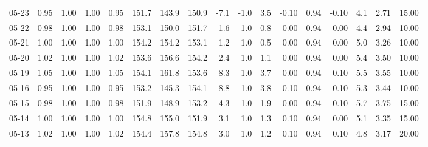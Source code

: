 \begin{threeparttable}
{\begin{tabular}{lrrrrrrrrrrrrrrrr}
  05-23 &         0.95 &           1.00 &          1.00 &          0.95 & 151.7 & 143.9 & 150.9 &       -7.1 &                     -1.0 &                 3.5 &      -0.10 &      0.94 &          -0.10 &              4.1 &            2.71 &                  15.00 \\
  05-22 &         0.98 &           1.00 &          1.00 &          0.98 & 153.1 & 150.0 & 151.7 &       -1.6 &                     -1.0 &                 0.8 &       0.00 &      0.94 &           0.00 &              4.4 &            2.94 &                  10.00 \\
  05-21 &         1.00 &           1.00 &          1.00 &          1.00 & 154.2 & 154.2 & 153.1 &        1.2 &                      1.0 &                 0.5 &       0.00 &      0.94 &           0.00 &              5.0 &            3.26 &                  10.00 \\
  05-20 &         1.02 &           1.00 &          1.00 &          1.02 & 153.6 & 156.6 & 154.2 &        2.4 &                      1.0 &                 1.1 &       0.00 &      0.94 &           0.00 &              5.4 &            3.50 &                  10.00 \\
  05-19 &         1.05 &           1.00 &          1.00 &          1.05 & 154.1 & 161.8 & 153.6 &        8.3 &                      1.0 &                 3.7 &       0.00 &      0.94 &           0.10 &              5.5 &            3.55 &                  10.00 \\
  05-16 &         0.95 &           1.00 &          1.00 &          0.95 & 153.2 & 145.3 & 154.1 &       -8.8 &                     -1.0 &                 3.8 &      -0.10 &      0.94 &          -0.10 &              5.3 &            3.44 &                  10.00 \\
  05-15 &         0.98 &           1.00 &          1.00 &          0.98 & 151.9 & 148.9 & 153.2 &       -4.3 &                     -1.0 &                 1.9 &       0.00 &      0.94 &          -0.10 &              5.7 &            3.75 &                  15.00 \\
  05-14 &         1.00 &           1.00 &          1.00 &          1.00 & 154.8 & 155.0 & 151.9 &        3.1 &                      1.0 &                 1.3 &       0.10 &      0.94 &           0.00 &              5.1 &            3.35 &                  15.00 \\
  05-13 &         1.02 &           1.00 &          1.00 &          1.02 & 154.4 & 157.8 & 154.8 &        3.0 &                      1.0 &                 1.2 &       0.10 &      0.94 &           0.10 &              4.8 &            3.17 &                  20.00 \\

\end{tabular}}
\end{threeparttable}
